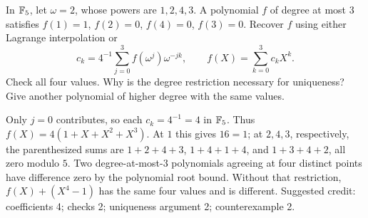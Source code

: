 In $\mathbb F_5$, let $\omega=2$, whose powers are $1,2,4,3$.
A polynomial $f$ of degree at most $3$ satisfies
$f(1)=1$, $f(2)=0$, $f(4)=0$, $f(3)=0$.
Recover $f$ using either Lagrange interpolation or
\[
c_k=4^{-1}\sum_{j=0}^3f(\omega^j)\omega^{-jk},
\qquad f(X)=\sum_{k=0}^3c_kX^k.
\]
Check all four values. Why is the degree restriction necessary for
uniqueness? Give another polynomial of higher degree with the same values.
\begin{solution}
Only $j=0$ contributes, so each $c_k=4^{-1}=4$ in $\mathbb F_5$.
Thus $f(X)=4(1+X+X^2+X^3)$.
At $1$ this gives $16=1$; at $2,4,3$, respectively, the parenthesized
sums are $1+2+4+3$, $1+4+1+4$, and $1+3+4+2$, all zero modulo $5$.
Two degree-at-most-$3$ polynomials agreeing at four distinct points
have difference zero by the polynomial root bound. Without that
restriction, $f(X)+(X^4-1)$ has the same four values and is different.
Suggested credit: coefficients 4; checks 2; uniqueness argument 2;
counterexample 2.
\end{solution}

